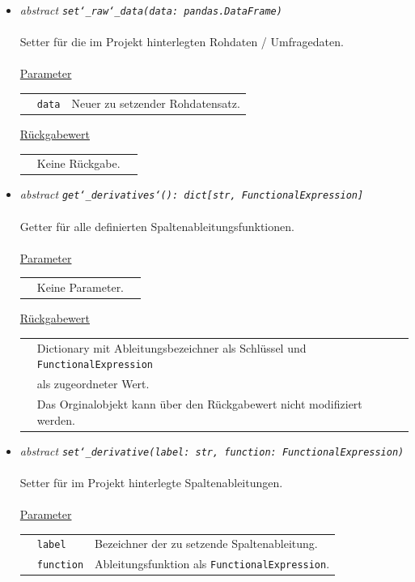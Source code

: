 \documentclass{article}
\begin{document}
\begin{itemize}
\item \textit{\flqq{}abstract\frqq} \texttt{\textit{set\char`_raw\char`_data(data: pandas.DataFrame)}}\\\\
Setter für die im Projekt hinterlegten Rohdaten / Umfragedaten.
\\\\
\underline{Parameter}\\
\begin{tabular}{lll}
 & \texttt{data} & Neuer zu setzender Rohdatensatz.\\
\end{tabular}

\underline{Rückgabewert}\\
\begin{tabular}{lll}
 & Keine Rückgabe.\\
\end{tabular}


\item \textit{\flqq{}abstract\frqq} \texttt{\textit{get\char`_derivatives\char`(): dict[str, FunctionalExpression]}}\\\\
Getter für alle definierten Spaltenableitungsfunktionen.
\\\\
\underline{Parameter}\\
\begin{tabular}{lll}
 & Keine Parameter.\\
\end{tabular}

\underline{Rückgabewert}\\
\begin{tabular}{lll}
 & Dictionary mit Ableitungsbezeichner als Schlüssel und \texttt{FunctionalExpression}\\
 & als zugeordneter Wert.\\
 & Das Orginalobjekt kann über den Rückgabewert nicht modifiziert werden.\\
\end{tabular}


\item \textit{\flqq{}abstract\frqq} \texttt{\textit{set\char`_derivative(label: str, function: FunctionalExpression)}}\\\\
Setter für im Projekt hinterlegte Spaltenableitungen.
\\\\
\underline{Parameter}\\
\begin{tabular}{lll}
 & \texttt{label} & Bezeichner der zu setzende Spaltenableitung.\\
 & \texttt{function} & Ableitungsfunktion als \texttt{FunctionalExpression}.\\
\end{tabular}


\end{itemize}
\end{document}
